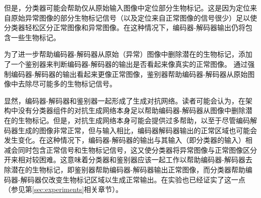但是，分类器可能会帮助仅从原始输入图像中定位部分生物标记。这是因为定位来自原始异常图像的部分生物标记信号（以及定位来自正常图像的信号很少）足以使分类器轻松区分正常图像和异常图像。在这种情况下，编码器-解码器输出仍将包含一些生物标记。

为了进一步帮助编码器-解码器从原始（异常）图像中删除潜在的生物标记，添加了一个鉴别器来判断编码器-解码器的输出是否看起来像真实的正常图像。 通过强制编码器-解码器的输出看起来更像正常图像，鉴别器帮助编码器-解码器从原始图像中去除尽可能多的生物标记信号。

显然，编码器-解码器和鉴别器一起形成了生成对抗网络。读者可能会认为，在架构中没有分类器组件的对抗生成网络本身足以帮助编码器-解码器从图像中删除潜在的生物标记。但是，对抗生成网络本身可能会提供过多帮助，以至于尽管编码解码器生成的图像非常正常，但与输入相比，编码器解码器输出的正常区域也可能会发生变化。在这种情况下，编码器-解码器的输出与其输入（即分类器的输入）相减会同时包含正常信号和生物标记信号，这又使分类器将异常图像与正常图像区分开来相对较困难。这意味着分类器和鉴别器应该一起工作以帮助编码器-解码器去除潜在的生物标记，即鉴别器帮助编码器-解码器输出正常图像，而分类器帮助编码器-解码器仅改变生物标记区域以生成正常输出。在实验也已经证实了这一点（参见第\ref{sec:experiments}相关章节）。

